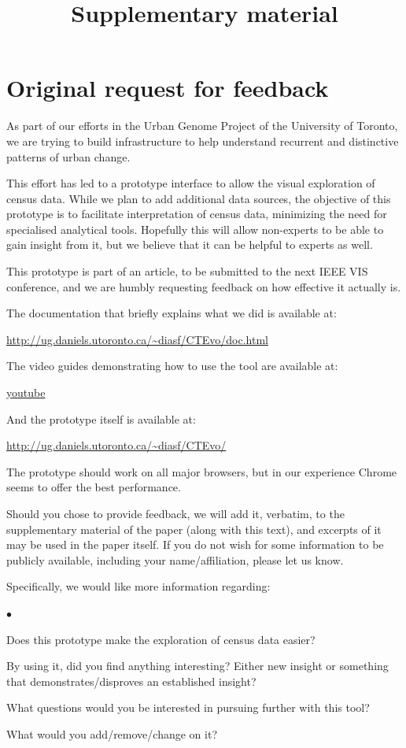 \documentclass[a4paper]{article}
\title{Supplementary material}
\author{}
\date{}
\newcommand{\squishlist}{
 \begin{list}{$\bullet$}
  { \setlength{\itemsep}{0pt}
     \setlength{\parsep}{3pt}
     \setlength{\topsep}{3pt}
     \setlength{\partopsep}{0pt}
     \setlength{\leftmargin}{1.5em}
     \setlength{\labelwidth}{1em}
     \setlength{\labelsep}{0.5em} } }
\newcommand{\squishend}{
  \end{list}  }
\begin{document}
\maketitle


\section{Original request for feedback}
As part of our efforts in the Urban Genome Project of the University of Toronto,
we are trying to build infrastructure to help understand recurrent and
distinctive patterns of urban change.

This effort has led to a prototype interface to allow the visual exploration of
census data. While we plan to add additional data sources, the objective of this
prototype is to facilitate interpretation of census data, minimizing the need
for specialised analytical tools. Hopefully this will allow non-experts to be
able to gain insight from it, but we believe that it can be helpful to experts
as well.  

This prototype is part of an article, to be submitted to the next IEEE VIS
conference, and we are humbly requesting feedback on how effective it actually
is.

The documentation that briefly explains what we did is available at:

\href{http://ug.daniels.utoronto.ca/~diasf/CTEvo/doc.html}{\url{http://ug.daniels.utoronto.ca/~diasf/CTEvo/doc.html}}

The video guides demonstrating how to use the tool are available at:

\href{https://www.youtube.com/watch?v=OZFUA0ThEaY&list=PLBd6KRI4PG-RcxAX35OfHd1DKl3qWfXRV}{youtube}

And the prototype itself is available at:

\href{http://ug.daniels.utoronto.ca/~diasf/CTEvo/}{\url{http://ug.daniels.utoronto.ca/~diasf/CTEvo/}}

The prototype should work on all major browsers, but in our experience Chrome
seems to offer the best performance.

Should you chose to provide feedback, we will add it, verbatim, to the
supplementary material of the paper (along with this text), and excerpts of it
may be used in the paper itself. If you do not wish for some information to be
publicly available, including your name/affiliation, please let us know.

Specifically, we would like more information regarding:
\squishlist
    \item{Does this prototype make the exploration of census data easier?}
    \item{By using it, did you find anything interesting? Either new insight or something that demonstrates/disproves an established insight? }
    \item{What questions would you be interested in pursuing further with this tool? }
    \item{What would you add/remove/change on it?}
\squishend
\end{document}
